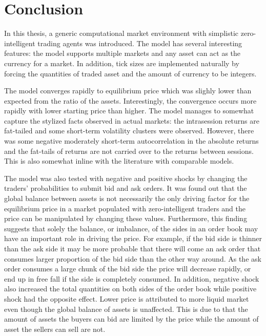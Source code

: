 

\section{Conclusion}

In this thesis, a generic computational market environment with simplistic
zero-intelligent trading agents was introduced. The model has several interesting features: 
the model supports multiple markets and any asset can act as the currency
for a market. In addition, tick sizes are implemented naturally by forcing
the quantities of traded asset and the amount of currency to be integers.

The model converges rapidly to equilibrium price which was slighly lower
than expected from the ratio of the assets. Interestingly, the convergence
occurs more rapidly with lower starting price than higher. The model manages 
to somewhat capture the stylized facts observed in actual markets: the intrasession 
returns are fat-tailed and some short-term volatility clusters were observed. 
However, there was some negative moderately short-term autocorrelation in the 
absolute returns and the fat-tails of returns are not carried over to the returns between sessions. 
This is also somewhat inline with the literature with comparable models.

The model was also tested with negative and positive shocks by changing the 
traders' probabilities to submit bid and ask orders. It was found out that
the global balance between assets is not necessarily the only driving factor for the 
equilibrium price in a market populated with zero-intelligent traders 
and the price can be manipulated by changing these values. Furthermore, this finding suggests that 
solely the balance, or imbalance, of the sides in an order book may have an important role in 
driving the price. For example, if the bid side is thinner than the ask side it may be more probable 
that there will come an ask order that consumes larger proportion of the bid side than the other way 
around. As the ask order consumes a large chunk of the bid side the price will decrease rapidly, 
or end up in free fall if the side is completely consumed. In addition, negative shock
also increased the total quantities on both sides of the order book while
positive shock had the opposite effect. Lower price is attributed to 
more liquid market even though the global balance of assets is unaffected.
This is due to that the amount of assets the buyers can bid are limited by the 
price while the amount of asset the sellers can sell are not. 


